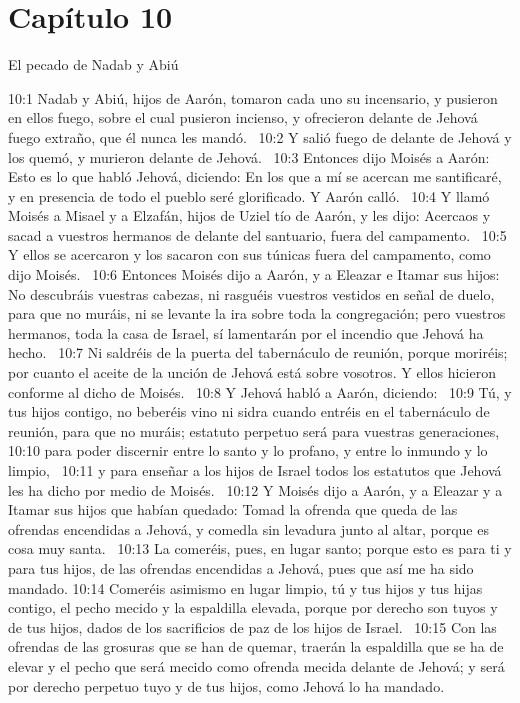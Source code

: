 \section*{Capítulo 10}
El pecado de Nadab y Abiú  

10:1 Nadab y Abiú, hijos de Aarón, tomaron cada uno su incensario, y pusieron en ellos fuego, sobre el cual pusieron incienso, y ofrecieron delante de Jehová fuego extraño, que él nunca les mandó.  
10:2 Y salió fuego de delante de Jehová y los quemó, y murieron delante de Jehová.  
10:3 Entonces dijo Moisés a Aarón: Esto es lo que habló Jehová, diciendo: En los que a mí se acercan me santificaré, y en presencia de todo el pueblo seré glorificado. Y Aarón calló.  
10:4 Y llamó Moisés a Misael y a Elzafán, hijos de Uziel tío de Aarón, y les dijo: Acercaos y sacad a vuestros hermanos de delante del santuario, fuera del campamento.  
10:5 Y ellos se acercaron y los sacaron con sus túnicas fuera del campamento, como dijo Moisés.  
10:6 Entonces Moisés dijo a Aarón, y a Eleazar e Itamar sus hijos: No descubráis vuestras cabezas, ni rasguéis vuestros vestidos en señal de duelo, para que no muráis, ni se levante la ira sobre toda la congregación; pero vuestros hermanos, toda la casa de Israel, sí lamentarán por el incendio que Jehová ha hecho.  
10:7 Ni saldréis de la puerta del tabernáculo de reunión, porque moriréis; por cuanto el aceite de la unción de Jehová está sobre vosotros. Y ellos hicieron conforme al dicho de Moisés.  
10:8 Y Jehová habló a Aarón, diciendo:  
10:9 Tú, y tus hijos contigo, no beberéis vino ni sidra cuando entréis en el tabernáculo de reunión, para que no muráis; estatuto perpetuo será para vuestras generaciones,  
10:10 para poder discernir entre lo santo y lo profano, y entre lo inmundo y lo limpio,  
10:11 y para enseñar a los hijos de Israel todos los estatutos que Jehová les ha dicho por medio de Moisés.  
10:12 Y Moisés dijo a Aarón, y a Eleazar y a Itamar sus hijos que habían quedado: Tomad la ofrenda que queda de las ofrendas encendidas a Jehová, y comedla sin levadura junto al altar, porque es cosa muy santa.  
10:13 La comeréis, pues, en lugar santo; porque esto es para ti y para tus hijos, de las ofrendas encendidas a Jehová, pues que así me ha sido mandado. 
10:14 Comeréis asimismo en lugar limpio, tú y tus hijos y tus hijas contigo, el pecho mecido y la espaldilla elevada, porque por derecho son tuyos y de tus hijos, dados de los sacrificios de paz de los hijos de Israel.  
10:15 Con las ofrendas de las grosuras que se han de quemar, traerán la espaldilla que se ha de elevar y el pecho que será mecido como ofrenda mecida delante de Jehová; y será por derecho perpetuo tuyo y de tus hijos, como Jehová lo ha mandado.  
